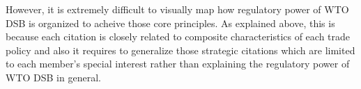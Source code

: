 However, it is extremely difficult to 
visually map how regulatory power of 
WTO DSB is organized to acheive 
those core principles. 
As explained above, 
this is because each citation is closely related 
to composite characteristics 
of each trade policy and also 
it requires to generalize those strategic 
citations which are limited 
to each member's special interest 
rather than explaining the 
regulatory power of WTO DSB in general. 

